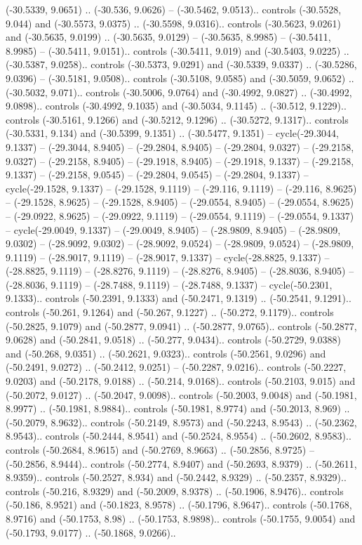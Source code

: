 \begin{scope}[shift={(2.5552, 9.9912)}]
\begin{scope}[shift={(48.1654, -14.8546)}]
(-30.5339, 9.0651) .. (-30.536, 9.0626) -- (-30.5462, 9.0513).. controls (-30.5528, 9.044) and (-30.5573, 9.0375) .. (-30.5598, 9.0316).. controls (-30.5623, 9.0261) and (-30.5635, 9.0199) .. (-30.5635, 9.0129) -- (-30.5635, 8.9985) -- (-30.5411, 8.9985) -- (-30.5411, 9.0151).. controls (-30.5411, 9.019) and (-30.5403, 9.0225) .. (-30.5387, 9.0258).. controls (-30.5373, 9.0291) and (-30.5339, 9.0337) .. (-30.5286, 9.0396) -- (-30.5181, 9.0508).. controls (-30.5108, 9.0585) and (-30.5059, 9.0652) .. (-30.5032, 9.071).. controls (-30.5006, 9.0764) and (-30.4992, 9.0827) .. (-30.4992, 9.0898).. controls (-30.4992, 9.1035) and (-30.5034, 9.1145) .. (-30.512, 9.1229).. controls (-30.5161, 9.1266) and (-30.5212, 9.1296) .. (-30.5272, 9.1317).. controls (-30.5331, 9.134) and (-30.5399, 9.1351) .. (-30.5477, 9.1351) -- cycle(-29.3044, 9.1337) -- (-29.3044, 8.9405) -- (-29.2804, 8.9405) -- (-29.2804, 9.0327) -- (-29.2158, 9.0327) -- (-29.2158, 8.9405) -- (-29.1918, 8.9405) -- (-29.1918, 9.1337) -- (-29.2158, 9.1337) -- (-29.2158, 9.0545) -- (-29.2804, 9.0545) -- (-29.2804, 9.1337) -- cycle(-29.1528, 9.1337) -- (-29.1528, 9.1119) -- (-29.116, 9.1119) -- (-29.116, 8.9625) -- (-29.1528, 8.9625) -- (-29.1528, 8.9405) -- (-29.0554, 8.9405) -- (-29.0554, 8.9625) -- (-29.0922, 8.9625) -- (-29.0922, 9.1119) -- (-29.0554, 9.1119) -- (-29.0554, 9.1337) -- cycle(-29.0049, 9.1337) -- (-29.0049, 8.9405) -- (-28.9809, 8.9405) -- (-28.9809, 9.0302) -- (-28.9092, 9.0302) -- (-28.9092, 9.0524) -- (-28.9809, 9.0524) -- (-28.9809, 9.1119) -- (-28.9017, 9.1119) -- (-28.9017, 9.1337) -- cycle(-28.8825, 9.1337) -- (-28.8825, 9.1119) -- (-28.8276, 9.1119) -- (-28.8276, 8.9405) -- (-28.8036, 8.9405) -- (-28.8036, 9.1119) -- (-28.7488, 9.1119) -- (-28.7488, 9.1337) -- cycle(-50.2301, 9.1333).. controls (-50.2391, 9.1333) and (-50.2471, 9.1319) .. (-50.2541, 9.1291).. controls (-50.261, 9.1264) and (-50.267, 9.1227) .. (-50.272, 9.1179).. controls (-50.2825, 9.1079) and (-50.2877, 9.0941) .. (-50.2877, 9.0765).. controls (-50.2877, 9.0628) and (-50.2841, 9.0518) .. (-50.277, 9.0434).. controls (-50.2729, 9.0388) and (-50.268, 9.0351) .. (-50.2621, 9.0323).. controls (-50.2561, 9.0296) and (-50.2491, 9.0272) .. (-50.2412, 9.0251) -- (-50.2287, 9.0216).. controls (-50.2227, 9.0203) and (-50.2178, 9.0188) .. (-50.214, 9.0168).. controls (-50.2103, 9.015) and (-50.2072, 9.0127) .. (-50.2047, 9.0098).. controls (-50.2003, 9.0048) and (-50.1981, 8.9977) .. (-50.1981, 8.9884).. controls (-50.1981, 8.9774) and (-50.2013, 8.969) .. (-50.2079, 8.9632).. controls (-50.2149, 8.9573) and (-50.2243, 8.9543) .. (-50.2362, 8.9543).. controls (-50.2444, 8.9541) and (-50.2524, 8.9554) .. (-50.2602, 8.9583).. controls (-50.2684, 8.9615) and (-50.2769, 8.9663) .. (-50.2856, 8.9725) -- (-50.2856, 8.9444).. controls (-50.2774, 8.9407) and (-50.2693, 8.9379) .. (-50.2611, 8.9359).. controls (-50.2527, 8.934) and (-50.2442, 8.9329) .. (-50.2357, 8.9329).. controls (-50.216, 8.9329) and (-50.2009, 8.9378) .. (-50.1906, 8.9476).. controls (-50.186, 8.9521) and (-50.1823, 8.9578) .. (-50.1796, 8.9647).. controls (-50.1768, 8.9716) and (-50.1753, 8.98) .. (-50.1753, 8.9898).. controls (-50.1755, 9.0054) and (-50.1793, 9.0177) .. (-50.1868, 9.0266).. 
\end{scope}
\end{scope}
